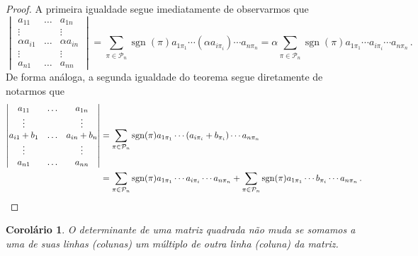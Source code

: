 \documentclass[12pt,a4paper]{report}
\newcommand{\mc}{\mathcal}
\newtheorem{cor}[thm]{Corolário}
\DeclareMathOperator{\sgn}{sgn}
\begin{document}
\begin{proof}
  A primeira igualdade segue imediatamente de observarmos que
  $$\begin{vmatrix}
    a_{11}&\ldots& a_{1n}\\
    \vdots&&\vdots\\
    \alpha a_{i1}&\ldots&\alpha a_{in}\\
    \vdots&&\vdots\\
    a_{n1}&\ldots&a_{nn}
  \end{vmatrix}=\sum_{\pi\in\mc P_n}\sgn(\pi)a_{1\pi_1}\cdots (\alpha a_{i\pi_i})\cdots a_{n\pi_n}
  =\alpha\sum_{\pi\in\mc P_n}\sgn(\pi)a_{1\pi_1}\cdots a_{i\pi_i}\cdots a_{n\pi_n}\,.$$
  De forma análoga, a segunda igualdade do teorema segue diretamente de notarmos que
  \begin{equation*}
    \begin{split}
      \begin{vmatrix}
        a_{11}&\ldots& a_{1n}\\
        \vdots&&\vdots\\
        a_{i1}+b_1&\ldots&a_{in}+b_n\\
        \vdots&&\vdots\\
        a_{n1}&\ldots&a_{nn}
      \end{vmatrix}&=\sum_{\pi\in\mc P_n}\sgn(\pi)a_{1\pi_1}\cdots (a_{i\pi_i}+b_{\pi_i})\cdots a_{n\pi_n}\\
      &=\sum_{\pi\in\mc P_n}\sgn(\pi)a_{1\pi_1}\cdots a_{i\pi_i}\cdots a_{n\pi_n}+\sum_{\pi\in\mc P_n}\sgn(\pi)a_{1\pi_1}\cdots b_{\pi_i}\cdots a_{n\pi_n}\,.\qedhere
    \end{split}
  \end{equation*}
\end{proof}

\begin{cor}
  O determinante de uma matriz quadrada não muda se somamos a uma de suas linhas (colunas) um múltiplo de outra linha (coluna) da matriz.
\end{cor}
\end{document}
